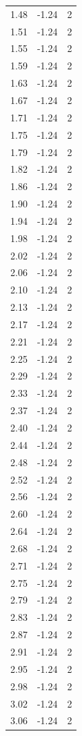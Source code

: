 \begin{longtable}{lrr}
  1.48 & -1.24 & 2 \\
  1.51 & -1.24 & 2 \\
  1.55 & -1.24 & 2 \\
  1.59 & -1.24 & 2 \\
  1.63 & -1.24 & 2 \\
  1.67 & -1.24 & 2 \\
  1.71 & -1.24 & 2 \\
  1.75 & -1.24 & 2 \\
  1.79 & -1.24 & 2 \\
  1.82 & -1.24 & 2 \\
  1.86 & -1.24 & 2 \\
  1.90 & -1.24 & 2 \\
  1.94 & -1.24 & 2 \\
  1.98 & -1.24 & 2 \\
  2.02 & -1.24 & 2 \\
  2.06 & -1.24 & 2 \\
  2.10 & -1.24 & 2 \\
  2.13 & -1.24 & 2 \\
  2.17 & -1.24 & 2 \\
  2.21 & -1.24 & 2 \\
  2.25 & -1.24 & 2 \\
  2.29 & -1.24 & 2 \\
  2.33 & -1.24 & 2 \\
  2.37 & -1.24 & 2 \\
  2.40 & -1.24 & 2 \\
  2.44 & -1.24 & 2 \\
  2.48 & -1.24 & 2 \\
  2.52 & -1.24 & 2 \\
  2.56 & -1.24 & 2 \\
  2.60 & -1.24 & 2 \\
  2.64 & -1.24 & 2 \\
  2.68 & -1.24 & 2 \\
  2.71 & -1.24 & 2 \\
  2.75 & -1.24 & 2 \\
  2.79 & -1.24 & 2 \\
  2.83 & -1.24 & 2 \\
  2.87 & -1.24 & 2 \\
  2.91 & -1.24 & 2 \\
  2.95 & -1.24 & 2 \\
  2.98 & -1.24 & 2 \\
  3.02 & -1.24 & 2 \\
  3.06 & -1.24 & 2 \\

\end{longtable}
